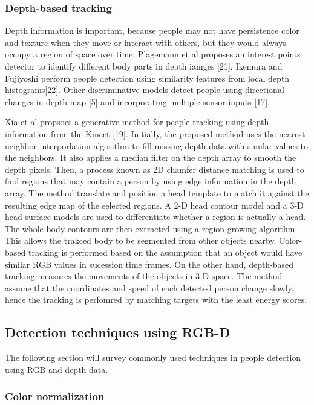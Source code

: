 \documentclass[paper=a4, fontsize=11pt]{scrartcl}
\numberwithin{equation}{section}		%
\numberwithin{figure}{section}			%
\numberwithin{table}{section}				%
\begin{document}
\subsubsection{Depth-based tracking}

Depth information is important, because people may not have persistence color and texture when they move or interact with others, but they would always occupy a region of space over time. Plagemann et al proposes an interest points detector to identify different body parts in depth iamges [21]. Ikemura and Fujiyoshi perform people detection using similarity features from local depth histograms[22]. Other discriminative models detect people using directional changes in depth map [5] and incorporating multiple sensor inputs [17].

Xia et al propsoes a generative method for people tracking using depth information from the Kinect [19]. Initially, the proposed method uses the nearest neighbor interporlation algorithm to fill missing depth data with similar values to the neighbors. It also applies a median filter on the depth array to smooth the depth pixels. Then, a process known as 2D chamfer distance matching is used to find regions that may contain a person by using edge information in the depth array. The method translate and position a head template to match it against the resulting edge map of the selected regions. A 2-D head contour model and a 3-D head surface models are used to differentiate whether a region is actually a head. The whole body contours are then extracted using a region growing algorithm. This allows the trakced body to be segmented from other objects nearby. Color-based tracking is performed based on the assumption that an object would have similar RGB values in sucession time frames. On the other hand, depth-based tracking measures the movements of the objects in 3-D space. The method assume that the coordinates and speed of each detected person change slowly, hence the tracking is perfomred by matching targets with the least energy scores.



\subsection{Detection techniques using RGB-D}

The following section will survey commonly used techniques in people detection using RGB and depth data.

\subsubsection{Color normalization}
\end{document}
